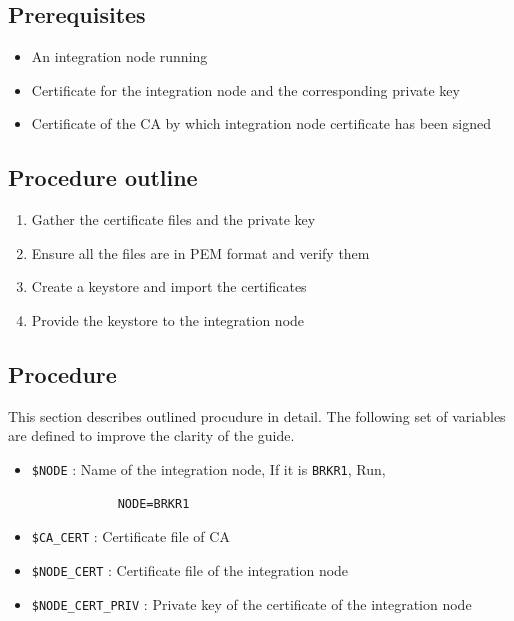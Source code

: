 \documentclass{article}
\begin{document}
    \subsection{Prerequisites}
    \begin{itemize}
        \item An integration node running
        \item Certificate for the integration node and the corresponding private key
        \item Certificate of the CA by which integration node certificate has been signed
    \end{itemize}

    \subsection{Procedure outline}
    \begin{enumerate}
        \item Gather the certificate files and the private key
        \item Ensure all the files are in PEM format and verify them
        \item Create a keystore and import the certificates
        \item Provide the keystore to the integration node
    \end{enumerate}

    \subsection{Procedure}
    This section describes outlined procudure in detail. The following set of variables are defined to improve the clarity of the guide.
    \begin{itemize}
        \item \lstinline{$NODE} : Name of the integration node, If it is \texttt{BRKR1}, Run,
        \begin{lstlisting}
            NODE=BRKR1
        \end{lstlisting}
        \item \lstinline{$CA_CERT} : Certificate file of CA
        \item \lstinline{$NODE_CERT} : Certificate file of the integration node
        \item \lstinline{$NODE_CERT_PRIV} : Private key of the certificate of the integration node
    \end{itemize}
\end{document}
